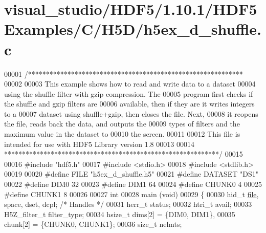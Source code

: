 \hypertarget{visual__studio_2_h_d_f5_21_810_81_2_h_d_f5_examples_2_c_2_h5_d_2h5ex__d__shuffle_8c_source}{}\section{visual\+\_\+studio/\+H\+D\+F5/1.10.1/\+H\+D\+F5\+Examples/\+C/\+H5\+D/h5ex\+\_\+d\+\_\+shuffle.c}
\label{visual__studio_2_h_d_f5_21_810_81_2_h_d_f5_examples_2_c_2_h5_d_2h5ex__d__shuffle_8c_source}

\begin{DoxyCode}
00001 \textcolor{comment}{/************************************************************}
00002 \textcolor{comment}{}
00003 \textcolor{comment}{  This example shows how to read and write data to a dataset}
00004 \textcolor{comment}{  using the shuffle filter with gzip compression.  The}
00005 \textcolor{comment}{  program first checks if the shuffle and gzip filters are}
00006 \textcolor{comment}{  available, then if they are it writes integers to a}
00007 \textcolor{comment}{  dataset using shuffle+gzip, then closes the file.  Next,}
00008 \textcolor{comment}{  it reopens the file, reads back the data, and outputs the}
00009 \textcolor{comment}{  types of filters and the maximum value in the dataset to}
00010 \textcolor{comment}{  the screen.}
00011 \textcolor{comment}{}
00012 \textcolor{comment}{  This file is intended for use with HDF5 Library version 1.8}
00013 \textcolor{comment}{}
00014 \textcolor{comment}{ ************************************************************/}
00015 
00016 \textcolor{preprocessor}{#include "hdf5.h"}
00017 \textcolor{preprocessor}{#include <stdio.h>}
00018 \textcolor{preprocessor}{#include <stdlib.h>}
00019 
00020 \textcolor{preprocessor}{#define FILE            "h5ex\_d\_shuffle.h5"}
00021 \textcolor{preprocessor}{#define DATASET         "DS1"}
00022 \textcolor{preprocessor}{#define DIM0            32}
00023 \textcolor{preprocessor}{#define DIM1            64}
00024 \textcolor{preprocessor}{#define CHUNK0          4}
00025 \textcolor{preprocessor}{#define CHUNK1          8}
00026 
00027 \textcolor{keywordtype}{int}
00028 main (\textcolor{keywordtype}{void})
00029 \{
00030     hid\_t           \hyperlink{structfile}{file}, space, dset, dcpl;    \textcolor{comment}{/* Handles */}
00031     herr\_t          status;
00032     htri\_t          avail;
00033     H5Z\_filter\_t    filter\_type;
00034     hsize\_t         dims[2] = \{DIM0, DIM1\},
00035                     chunk[2] = \{CHUNK0, CHUNK1\};
00036     \textcolor{keywordtype}{size\_t}          nelmts;

\end{DoxyCode}
